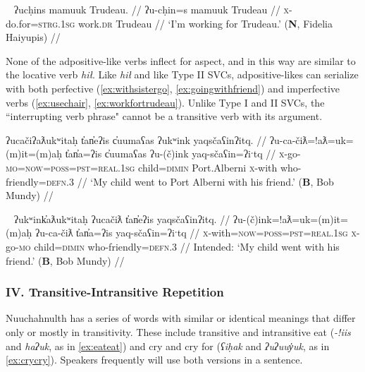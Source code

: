 \ex~ \label{ex:workfortrudeau}
\begingl
\glpreamble ʔucḥins mamuuk Trudeau. //
\gla ʔu-cḥin=s mamuuk Trudeau //
\glb \textsc{x}-do.for=\textsc{strg.1sg} work.\textsc{dr} Trudeau //
\glft `I'm working for Trudeau.' (\textbf{N}, Fidelia Haiyupis) //
\endgl
\xe

None of the adpositive-like verbs inflect for aspect, and in this way are similar to the locative verb \textit{hił}. Like \textit{hił} and like Type II SVCs, adpositive-likes can serialize with both perfective (\ref{ex:withsistergo}, \ref{ex:goingwithfriend}) and imperfective verbs (\ref{ex:usechair}, \ref{ex:workfortrudeau}). Unlike Type I and II SVCs, the ``interrupting verb phrase" cannot be a transitive verb with its argument.

\ex \label{ex:goingwithfriend}
\begingl
\glpreamble ʔucačiʔaƛukʷitaḥ t̓an̓eʔis c̓uumaʕas ʔukʷink yaqsčaʕinʔitq. //
\gla ʔu-ca-čiƛ=!aƛ=uk=(m)it=(m)aḥ t̓an̓a=ʔis c̓uumaʕas ʔu-(č)ink yaq-sčaʕin=ʔiˑtq //
\glb \textsc{x}-go-\textsc{mo}=\textsc{now}=\textsc{poss}=\textsc{pst}=\textsc{real.1sg} child=\textsc{dimin} Port.Alberni \textsc{x}-with who-friendly=\textsc{defn.3} //
\glft `My child went to Port Alberni with his friend.' (\textbf{B}, Bob Mundy) //
\endgl
\xe

\ex~ \label{ex:*goingwithfriend}
\begingl
\glpreamble *ʔukʷink̓aƛukʷitaḥ ʔucačiƛ t̓an̓eʔis yaqsčaʕinʔitq. //
\gla ʔu-(č)ink=!aƛ=uk=(m)it=(m)aḥ ʔu-ca-čiƛ t̓an̓a=ʔis yaq-sčaʕin=ʔiˑtq //
\glb \textsc{x}-with=\textsc{now}=\textsc{poss}=\textsc{pst}=\textsc{real.1sg} \textsc{x}-go-\textsc{mo} child=\textsc{dimin} who-friendly=\textsc{defn.3} //
\glft Intended: `My child went with his friend.' (\textbf{B}, Bob Mundy) //
\endgl
\xe


\vspace{10pt}

\subsubsection{IV. Transitive-Intransitive Repetition}

\vspace{10pt}

Nuuchahnulth has a series of words with similar or identical meanings that differ only or mostly in transitivity. These include transitive and intransitive eat (\textit{-!iis} and \textit{haʔuk}, as in \ref{ex:eateat}) and cry and cry for (\textit{ʕiḥak} and \textit{ʔuʔuuy̓uk}, as in \ref{ex:crycry}). Speakers frequently will use both versions in a sentence.

